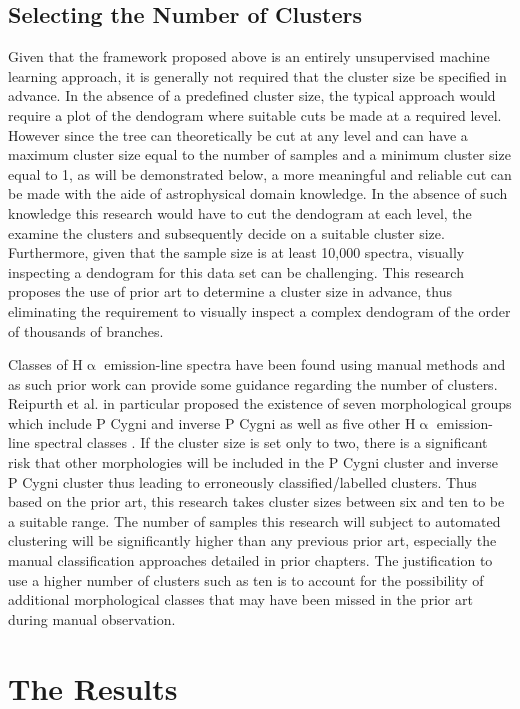 \subsection{Selecting the Number of Clusters}

Given that the framework proposed above is an entirely unsupervised machine learning approach, it is generally not required that the cluster size be specified in advance. In the absence of a predefined cluster size, the typical approach would require a plot of the dendogram where suitable cuts be made at a required level. However since the tree can theoretically be cut at any level and can have a maximum cluster size equal to the number of samples and a minimum cluster size equal to 1, as will be demonstrated below, a more meaningful and reliable cut can be made with the aide of astrophysical domain knowledge. In the absence of such knowledge this research would have to cut the dendogram at each level, the examine the clusters and subsequently decide on a suitable cluster size. Furthermore, given that the sample size is at least 10,000 spectra, visually inspecting a dendogram for this data set can be challenging. This research proposes the use of prior art to determine a cluster size in advance, thus eliminating the requirement to visually inspect a complex dendogram of the order of thousands of branches. 

Classes of H$\upalpha$ emission-line spectra have been found using manual methods and as such prior work can provide some guidance regarding the number of clusters. Reipurth et al. in particular proposed the existence of seven morphological groups which include P Cygni and inverse P Cygni as well as five other H$\upalpha$ emission-line spectral classes \cite{reipurth1996hupalpha}. If the cluster size is set only to two, there is a significant risk that other morphologies will be included in the P Cygni cluster and inverse P Cygni cluster thus leading to erroneously classified/labelled clusters. Thus based on the prior art, this research takes cluster sizes between six and ten to be a suitable range. The number of samples this research will subject to automated clustering will be significantly higher than any previous prior art, especially the manual classification approaches detailed in prior chapters. The justification to use a higher number of clusters such as ten is to account for the possibility of additional morphological classes that may have been missed in the prior art during manual observation. 

\section{The Results}

